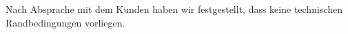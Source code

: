 Nach Absprache mit dem Kunden haben wir festgestellt, dass keine technischen Randbedingungen vorliegen.